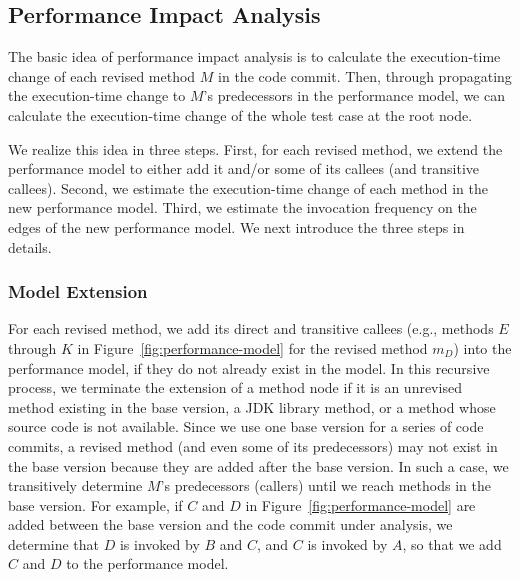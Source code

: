 \subsection{Performance Impact Analysis}
\label{subsec:direct}

The basic idea of performance impact analysis is to calculate the  execution-time change of each revised method $M$ in the code commit. Then, through propagating the execution-time change to $M$'s predecessors in the performance model, we can calculate the execution-time change of the whole test case at the root node. 


We realize this idea in three steps. First, for each revised method, we extend the performance model to either add it and/or some of its callees (and transitive callees). Second, we estimate the execution-time change of each method in the new performance model. Third, we estimate the invocation frequency on the edges of the new performance model. We next introduce the three steps in details.



\subsubsection{Model Extension}
\label{subsub:findInvoke}

For each revised method, we add its direct and transitive callees (e.g., methods $E$ through $K$ in Figure~\ref{fig:performance-model} for the revised method $m_D$) into the performance model, if they do not already exist in the model. In this recursive process, we terminate the extension of a method node if it is an unrevised method existing in the base version, a JDK library method, or a method whose source code is not available. Since we use one base version for a series of code commits, a revised method (and even some of its predecessors) may not exist in the base version because they are added after the base version. In such a case, we transitively determine $M$'s predecessors (callers) until we reach methods in the base version. For example, if $C$ and $D$ in Figure~\ref{fig:performance-model} are added between the base version and the code commit under analysis, we determine that $D$ is invoked by $B$ and $C$, and $C$ is invoked by $A$, so that we add $C$ and $D$ to the performance model. 

